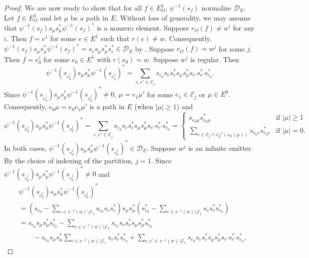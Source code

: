 \documentclass[12pt]{amsbook}%
\theoremstyle{defin}
\theoremstyle{remark}
\numberwithin{equation}{chapter}
\numberwithin{theor}{section}
\begin{document}
\begin{proof}
We are now ready to show that for all $f \in E_O^1$, $\psi^{-1} (s_f)$ normalize $\mathcal{D}_E$.  Let $f \in E_O^1$ and let $\mu$ be a path in $E$.  Without loss of generality, we may assume that $\psi^{-1} ( s_f ) s_\mu s_\mu^* \psi^{-1} ( s_f )^*$ is a nonzero element.  Suppose $r_{O} ( f ) \neq w^i$ for any $i$.  Then $f = e^1$ for some $e \in E^1$ such that $r(e) \neq w$.  Consequently,  $\psi^{-1} ( s_f ) s_\mu s_\mu^* \psi^{-1} ( s_f )^* = s_{ e }  s_\mu s_\mu^* s_e^* \in \mathcal{D}_E$ by \cite[Lemma~4.1]{nbtmcmfw:gaoe}.  Suppose $r_{O} ( f ) = w^j$ for some $j$.  Then $f = e_0^j$ for some $e_0 \in E^1$ with $r ( e_0 ) = w$.  Suppose $w^j$ is regular.  Then
\[
\psi^{-1} ( s_{ e_0^j } ) s_\mu s_\mu^* \psi^{-1} ( s_{ e_0^j } )^* = \sum_{e, e' \in \mathcal{E}_j} s_{e_0}  s_e s_e^* s_\mu s_\mu^* s_{e'} s_{e'}^* s_{e_0}^*.
\]
Since $\psi^{-1} ( s_{ e_0^j } ) s_\mu s_\mu^* \psi^{-1} ( s_{ e_0^j } )^*  \neq 0$, $\mu = e_1 \mu'$ for some $e_1 \in \mathcal{E}_j$ or $\mu \in E^0$.  Consequently, $e_0 \mu = e_0 e_1 \mu'$ is a path in $E$ (when $|\mu| \geq 1$) and 
\[
\psi^{-1} ( s_{ e_0^j } ) s_\mu s_\mu^* \psi^{-1} ( s_{ e_0^j } )^* = \sum_{e, e' \in \mathcal{E}_j} s_{e_0}  s_e s_e^* s_\mu s_\mu^* s_{e'} s_{e'}^* s_{e_0}^* =
 \begin{cases}
s_{e_0 \mu } s_{ e_0 \mu }^* &\text{if $|\mu| \geq 1$} \\
\displaystyle \sum_{  e\in \mathcal{E}_j \cap r_{E}^{-1} ( s_E(\mu)) } s_{e_0 e} s_{ e_0 e }^* &\text{if $|\mu| =0$.} 
\end{cases}
\]
In both cases, $\psi^{-1} ( s_{ e_0^j } ) s_\mu s_\mu^* \psi^{-1} ( s_{ e_0^j } )^* \in \mathcal{D}_E$.  Suppose $w^j$ is an infinite emitter.  By the choice of indexing of the partition, $j =1$.  Since $\psi^{-1} ( s_{ e_0^j } ) s_\mu s_\mu^* \psi^{-1} ( s_{e_0^j} )^* \neq 0$ and
\begin{align*}
&\psi^{-1} ( s_{ e_0^j } ) s_\mu s_\mu^* \psi^{-1} ( s_{e_0^j} )^* \\
&= \left( s_{e_0} - \sum_{ e \in s^{-1}(w) \setminus \mathcal{E}_1} s_{e_0} s_{e}s_e^* \right) s_\mu s_\mu^*  \left( s_{e_0}^* - \sum_{ e \in s^{-1}(w) \setminus \mathcal{E}_1} s_{e} s_{e}^*s_{e_0}^* \right) \\
&= s_{e_0} s_\mu s_\mu^* s_{e_0}^* -  \sum_{ e \in s^{-1}(w) \setminus \mathcal{E}_1} s_{e_0} s_{e}s_e^* s_\mu s_\mu^* s_{e_0}^* \\
&\qquad  - s_{e_0}s_\mu s_\mu^* \sum_{ e \in s^{-1}(w) \setminus \mathcal{E}_1} s_{e} s_{e}^*s_{e_0}^*  + \sum_{ e, e'  \in s^{-1}(w) \setminus \mathcal{E}_1 } s_{e_0} s_{e} s_{e}^* s_\mu s_\mu^* s_{e'} s_{e'}^* s_{e_0}^*,

\end{align*}
\end{proof}
\end{document}
